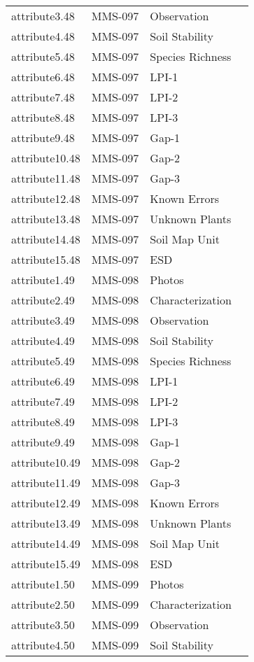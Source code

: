 \documentclass[
]{article}
\begin{document}
\begin{longtable}[]{@{}llll@{}}
attribute3.48 & MMS-097 & Observation & \\
attribute4.48 & MMS-097 & Soil Stability & \\
attribute5.48 & MMS-097 & Species Richness & \\
attribute6.48 & MMS-097 & LPI-1 & \\
attribute7.48 & MMS-097 & LPI-2 & \\
attribute8.48 & MMS-097 & LPI-3 & \\
attribute9.48 & MMS-097 & Gap-1 & \\
attribute10.48 & MMS-097 & Gap-2 & \\
attribute11.48 & MMS-097 & Gap-3 & \\
attribute12.48 & MMS-097 & Known Errors & \\
attribute13.48 & MMS-097 & Unknown Plants & \\
attribute14.48 & MMS-097 & Soil Map Unit & \\
attribute15.48 & MMS-097 & ESD & \\
attribute1.49 & MMS-098 & Photos & \\
attribute2.49 & MMS-098 & Characterization & \\
attribute3.49 & MMS-098 & Observation & \\
attribute4.49 & MMS-098 & Soil Stability & \\
attribute5.49 & MMS-098 & Species Richness & \\
attribute6.49 & MMS-098 & LPI-1 & \\
attribute7.49 & MMS-098 & LPI-2 & \\
attribute8.49 & MMS-098 & LPI-3 & \\
attribute9.49 & MMS-098 & Gap-1 & \\
attribute10.49 & MMS-098 & Gap-2 & \\
attribute11.49 & MMS-098 & Gap-3 & \\
attribute12.49 & MMS-098 & Known Errors & \\
attribute13.49 & MMS-098 & Unknown Plants & \\
attribute14.49 & MMS-098 & Soil Map Unit & \\
attribute15.49 & MMS-098 & ESD & \\
attribute1.50 & MMS-099 & Photos & \\
attribute2.50 & MMS-099 & Characterization & \\
attribute3.50 & MMS-099 & Observation & \\
attribute4.50 & MMS-099 & Soil Stability & \\

\end{longtable}
\end{document}
